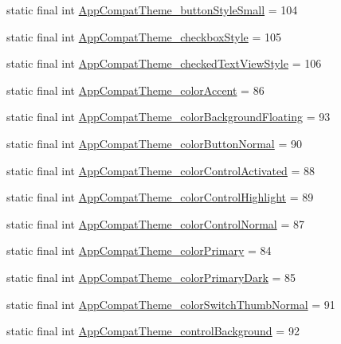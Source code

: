 \begin{CompactItemize}
\item 
static final int \hyperlink{classandroid_1_1support_1_1v4_1_1_r_1_1styleable_71e1206792e08e069496577fcab26e1b}{AppCompatTheme\_\-buttonStyleSmall} = 104
\item 
static final int \hyperlink{classandroid_1_1support_1_1v4_1_1_r_1_1styleable_2952864b487c0fdf826370ab068042b3}{AppCompatTheme\_\-checkboxStyle} = 105
\item 
static final int \hyperlink{classandroid_1_1support_1_1v4_1_1_r_1_1styleable_504638bb33551868625294f24e6d75c7}{AppCompatTheme\_\-checkedTextViewStyle} = 106
\item 
static final int \hyperlink{classandroid_1_1support_1_1v4_1_1_r_1_1styleable_3b87ab5d2175f20e4b41056387826bdc}{AppCompatTheme\_\-colorAccent} = 86
\item 
static final int \hyperlink{classandroid_1_1support_1_1v4_1_1_r_1_1styleable_2345bf81c44b196ed19b9beae5d073b2}{AppCompatTheme\_\-colorBackgroundFloating} = 93
\item 
static final int \hyperlink{classandroid_1_1support_1_1v4_1_1_r_1_1styleable_9222a7848886917a4f8f848b38a41538}{AppCompatTheme\_\-colorButtonNormal} = 90
\item 
static final int \hyperlink{classandroid_1_1support_1_1v4_1_1_r_1_1styleable_2d7dc080e71e4c68a0321538983ca317}{AppCompatTheme\_\-colorControlActivated} = 88
\item 
static final int \hyperlink{classandroid_1_1support_1_1v4_1_1_r_1_1styleable_346d6c8a5cb33583cb24fea2db2499ae}{AppCompatTheme\_\-colorControlHighlight} = 89
\item 
static final int \hyperlink{classandroid_1_1support_1_1v4_1_1_r_1_1styleable_dbb405fc0a9198e2e1ebbedf54fa8518}{AppCompatTheme\_\-colorControlNormal} = 87
\item 
static final int \hyperlink{classandroid_1_1support_1_1v4_1_1_r_1_1styleable_000f8fd391639a0e396991fb848871f7}{AppCompatTheme\_\-colorPrimary} = 84
\item 
static final int \hyperlink{classandroid_1_1support_1_1v4_1_1_r_1_1styleable_d4bbe6369273502bd320159d8f9742fb}{AppCompatTheme\_\-colorPrimaryDark} = 85
\item 
static final int \hyperlink{classandroid_1_1support_1_1v4_1_1_r_1_1styleable_6ea63f1233fe0a7b2a627bae8dbdb446}{AppCompatTheme\_\-colorSwitchThumbNormal} = 91
\item 
static final int \hyperlink{classandroid_1_1support_1_1v4_1_1_r_1_1styleable_b1ed611d790b8dc74dd266f0047196a2}{AppCompatTheme\_\-controlBackground} = 92

\end{CompactItemize}
